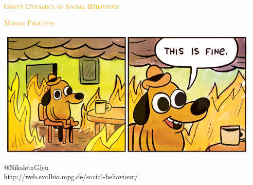 \documentclass{beamer}
\begin{document}
\begin{frame}
    \begin{center}
        \Large
        \textcolor{orange}{\textsc{Group Dynamics of Social Behaviour}}
    \end{center}
\end{frame}

\begin{frame}
    \begin{center}
        \Large
        \textcolor{orange}{\textsc{Moran Proccess}} \\ \vspace{3pt}
    \end{center}
\end{frame}

\begin{frame}
    \centering
    \includegraphics[width=.75\textwidth]{static/close.png}
\end{frame}

\begin{frame}
    \begin{center}
    \faTwitter @NikoletaGlyn \\
    http://web.evolbio.mpg.de/social-behaviour/
    \end{center}
\end{frame}
\end{document}
